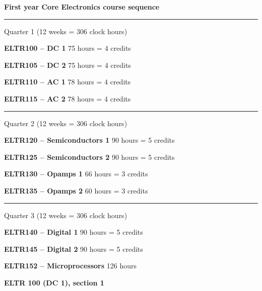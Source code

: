 

\centerline{\bf First year Core Electronics course sequence} \bigskip 

\vskip 5pt
\hrule
\vskip 5pt

\noindent
Quarter 1 (12 weeks = 306 clock hours)

\vskip 10pt

{\bf ELTR100 -- DC 1} \hskip 10pt 75 hours = 4 credits 
 
\vskip 10pt

{\bf ELTR105 -- DC 2} \hskip 10pt 75 hours = 4 credits 
 
\vskip 10pt

{\bf ELTR110 -- AC 1} \hskip 10pt 78 hours = 4 credits 
 
\vskip 10pt

{\bf ELTR115 -- AC 2} \hskip 10pt 78 hours = 4 credits 
 
\vskip 10pt


\vskip 5pt
\hrule
\vskip 5pt

\noindent
Quarter 2 (12 weeks = 306 clock hours)

\vskip 10pt

{\bf ELTR120 -- Semiconductors 1} \hskip 10pt 90 hours = 5 credits 
 
\vskip 10pt

{\bf ELTR125 -- Semiconductors 2} \hskip 10pt 90 hours = 5 credits 
 
\vskip 10pt

{\bf ELTR130 -- Opamps 1} \hskip 10pt 66 hours = 3 credits 
 
\vskip 10pt

{\bf ELTR135 -- Opamps 2} \hskip 10pt 60 hours = 3 credits 
 
\vskip 10pt


\vskip 5pt
\hrule
\vskip 5pt

\noindent
Quarter 3 (12 weeks = 306 clock hours)

\vskip 10pt

{\bf ELTR140 -- Digital 1} \hskip 10pt 90 hours = 5 credits 
 
\vskip 10pt

{\bf ELTR145 -- Digital 2} \hskip 10pt 90 hours = 5 credits 
 
\vskip 10pt

{\bf ELTR152 -- Microprocessors} \hskip 10pt 126 hours
 

\vfil \eject

\centerline{\bf ELTR 100 (DC 1), section 1} \bigskip 
 
